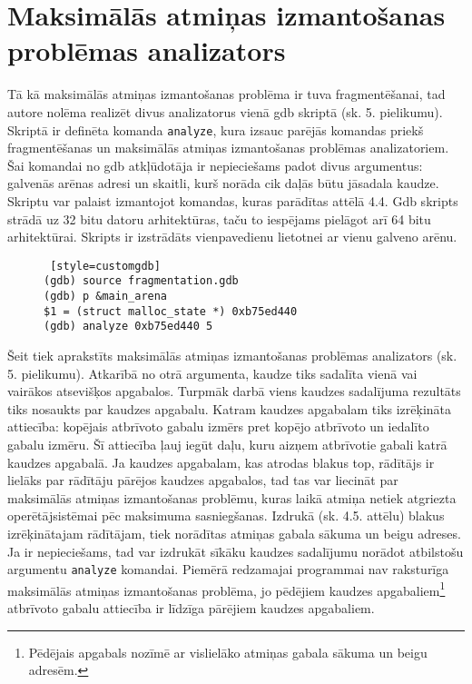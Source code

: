 \section{Maksimālās atmiņas izmantošanas problēmas analizators}
Tā kā maksimālās atmiņas izmantošanas problēma ir tuva fragmentēšanai, tad autore nolēma realizēt divus analizatorus vienā gdb skriptā (sk. 5. pielikumu).
Skriptā ir definēta komanda \texttt{analyze}, kura izsauc parējās komandas priekš fragmentēšanas un maksimālās atmiņas izmantošanas problēmas analizatoriem.
Šai komandai no gdb atkļūdotāja ir nepieciešams padot divus argumentus: galvenās arēnas adresi un skaitli, kurš norāda cik daļās būtu jāsadala kaudze.
Skriptu var palaist izmantojot komandas, kuras parādītas attēlā 4.4.
Gdb skripts strādā uz 32 bitu datoru arhitektūras, taču to iespējams pielāgot arī 64 bitu arhitektūrai.
Skripts ir izstrādāts vienpavedienu lietotnei ar vienu galveno arēnu.

\begin{figure}[h]
\begin{lstlisting} [style=customgdb]
(gdb) source fragmentation.gdb
(gdb) p &main_arena
$1 = (struct malloc_state *) 0xb75ed440
(gdb) analyze 0xb75ed440 5
\end{lstlisting}
\caption{\textbf{\fontsize{11}{12}\selectfont {Gdb skripta palaišana}}}
\end{figure} %


Šeit tiek aprakstīts maksimālās atmiņas izmantošanas problēmas analizators (sk. 5. pielikumu).
Atkarībā no otrā argumenta, kaudze tiks sadalīta vienā vai vairākos atsevišķos apgabalos.
Turpmāk darbā viens kaudzes sadalījuma rezultāts tiks nosaukts par kaudzes apgabalu.
Katram kaudzes apgabalam tiks izrēķināta attiecība: kopējais atbrīvoto gabalu izmērs pret kopējo atbrīvoto un iedalīto gabalu izmēru.
Šī attiecība ļauj iegūt daļu, kuru aizņem atbrīvotie gabali katrā kaudzes apgabalā.
Ja kaudzes apgabalam, kas atrodas blakus top, rādītājs ir lielāks par rādītāju pārējos kaudzes apgabalos, tad tas var liecināt par maksimālās atmiņas izmantošanas problēmu, kuras laikā atmiņa netiek atgriezta operētājsistēmai pēc maksimuma sasniegšanas.
Izdrukā (sk. 4.5. attēlu) blakus izrēķinātajam rādītājam, tiek norādītas atmiņas gabala sākuma un beigu adreses.
Ja ir nepieciešams, tad var izdrukāt sīkāku kaudzes sadalījumu norādot atbilstošu argumentu \texttt{analyze} komandai.
Piemērā redzamajai programmai nav raksturīga maksimālās atmiņas izmantošanas problēma, jo pēdējiem kaudzes apgabaliem\footnote{Pēdējais apgabals nozīmē ar vislielāko atmiņas gabala sākuma un beigu adresēm.} atbrīvoto gabalu attiecība ir līdzīga pārējiem kaudzes apgabaliem.

